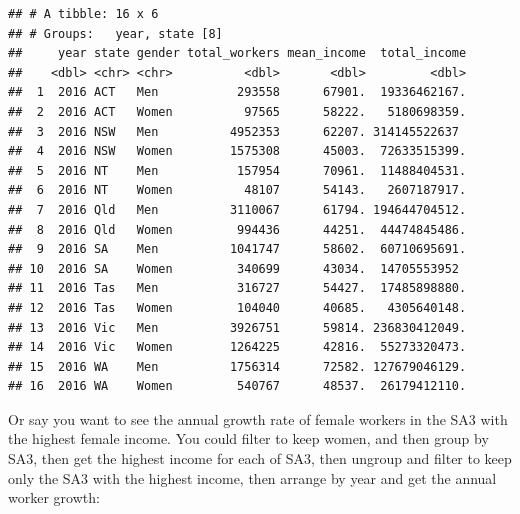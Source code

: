 \documentclass[]{book}
\newenvironment{Shaded}{\begin{snugshade}}{\end{snugshade}}
\newcommand{\DataTypeTok}[1]{\textcolor[rgb]{0.13,0.29,0.53}{#1}}
\newcommand{\DecValTok}[1]{\textcolor[rgb]{0.00,0.00,0.81}{#1}}
\newcommand{\KeywordTok}[1]{\textcolor[rgb]{0.13,0.29,0.53}{\textbf{#1}}}
\newcommand{\NormalTok}[1]{#1}
\newcommand{\OperatorTok}[1]{\textcolor[rgb]{0.81,0.36,0.00}{\textbf{#1}}}
\newcommand{\StringTok}[1]{\textcolor[rgb]{0.31,0.60,0.02}{#1}}
\begin{document}
\begin{verbatim}
## # A tibble: 16 x 6
## # Groups:   year, state [8]
##     year state gender total_workers mean_income  total_income
##    <dbl> <chr> <chr>          <dbl>       <dbl>         <dbl>
##  1  2016 ACT   Men           293558      67901.  19336462167.
##  2  2016 ACT   Women          97565      58222.   5180698359.
##  3  2016 NSW   Men          4952353      62207. 314145522637 
##  4  2016 NSW   Women        1575308      45003.  72633515399.
##  5  2016 NT    Men           157954      70961.  11488404531.
##  6  2016 NT    Women          48107      54143.   2607187917.
##  7  2016 Qld   Men          3110067      61794. 194644704512.
##  8  2016 Qld   Women         994436      44251.  44474845486.
##  9  2016 SA    Men          1041747      58602.  60710695691.
## 10  2016 SA    Women         340699      43034.  14705553952 
## 11  2016 Tas   Men           316727      54427.  17485898880.
## 12  2016 Tas   Women         104040      40685.   4305640148.
## 13  2016 Vic   Men          3926751      59814. 236830412049.
## 14  2016 Vic   Women        1264225      42816.  55273320473.
## 15  2016 WA    Men          1756314      72582. 127679046129.
## 16  2016 WA    Women         540767      48537.  26179412110.
\end{verbatim}

Or say you want to see the annual growth rate of female workers in the SA3 with the highest female income. You could filter to keep women, and then group by SA3, then get the highest income for each of SA3, then ungroup and filter to keep only the SA3 with the highest income, then arrange by year and get the annual worker growth:

\begin{Shaded}
\end{Shaded}
\end{document}
